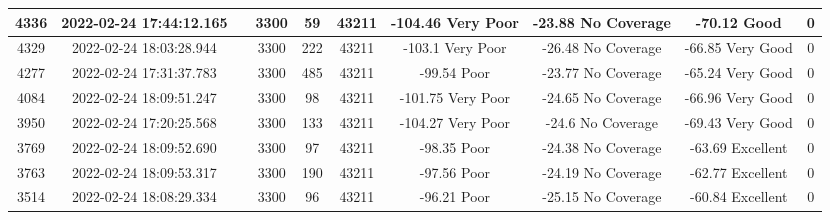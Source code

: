 \begin{longtable*}{|c|c|c|c|c|c|c|c|c|c|}
4336&2022-02-24 17:44:12.165&&3300&59&43211& -104.46   Very Poor   & -23.88    No Coverage & -70.12    Good        & 0\\\hline
{}4329&2022-02-24 18:03:28.944&&3300&222&43211& -103.1    Very Poor   & -26.48    No Coverage & -66.85    Very Good   & 0\\\hline
{}4277&2022-02-24 17:31:37.783&&3300&485&43211& -99.54    Poor        & -23.77    No Coverage & -65.24    Very Good   & 0\\\hline
{}4084&2022-02-24 18:09:51.247&&3300&98&43211& -101.75   Very Poor   & -24.65    No Coverage & -66.96    Very Good   & 0\\\hline
{}3950&2022-02-24 17:20:25.568&&3300&133&43211& -104.27   Very Poor   & -24.6     No Coverage & -69.43    Very Good   & 0\\\hline
{}3769&2022-02-24 18:09:52.690&&3300&97&43211& -98.35    Poor        & -24.38    No Coverage & -63.69    Excellent   & 0\\\hline
{}3763&2022-02-24 18:09:53.317&&3300&190&43211& -97.56    Poor        & -24.19    No Coverage & -62.77    Excellent   & 0\\\hline
{}3514&2022-02-24 18:08:29.334&&3300&96&43211& -96.21    Poor        & -25.15    No Coverage & -60.84    Excellent   & 0\\\hline

\end{longtable*}
